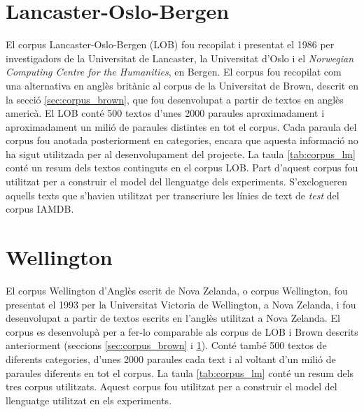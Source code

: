 \section{Lancaster-Oslo-Bergen}\label{sec:corpus_lob}
El corpus Lancaster-Oslo-Bergen (LOB) fou recopilat i presentat el 1986\cite{johansson1986tagged} per investigadors de la Universitat de Lancaster, la Universitat d'Oslo i el \emph{Norwegian Computing Centre for the Humanities}, en Bergen. El corpus fou recopilat com una alternativa en anglès britànic al corpus de la Universitat de Brown, descrit en la secció \ref{sec:corpus_brown}, que fou desenvolupat a partir de textos en anglès americà. El LOB conté 500 textos d'unes 2000 paraules aproximadament i aproximadament un milió de paraules distintes en tot el corpus. Cada paraula del corpus fou anotada posteriorment en categories, encara que aquesta informació no ha sigut utilitzada per al desenvolupament del projecte. La taula \ref{tab:corpus_lm} conté un resum dels textos continguts en el corpus LOB. Part d'aquest corpus fou utilitzat per a construir el model del llenguatge dels experiments. S'exclogueren aquells texts que s'havien utilitzat per transcriure les línies de text de \emph{test} del corpus IAMDB.

\section{Wellington}\label{sec:corpus_wellington}
El corpus Wellington d'Anglès escrit de Nova Zelanda, o corpus Wellington, fou presentat el 1993\cite{bauer1993manual} per la Universitat Victoria de Wellington, a Nova Zelanda, i fou desenvolupat a partir de textos escrits en l'anglès utilitzat a Nova Zelanda. El corpus es desenvolupà per a fer-lo comparable als corpus de LOB i Brown descrits anteriorment (seccions \ref{sec:corpus_brown} i \ref{sec:corpus_lob}). Conté també 500 textos de diferents categories, d'unes 2000 paraules cada text i al voltant d'un milió de paraules diferents en tot el corpus. La taula \ref{tab:corpus_lm} conté un resum dels tres corpus utilitzats. Aquest corpus fou utilitzat per a construir el model del llenguatge utilitzat en els experiments.

